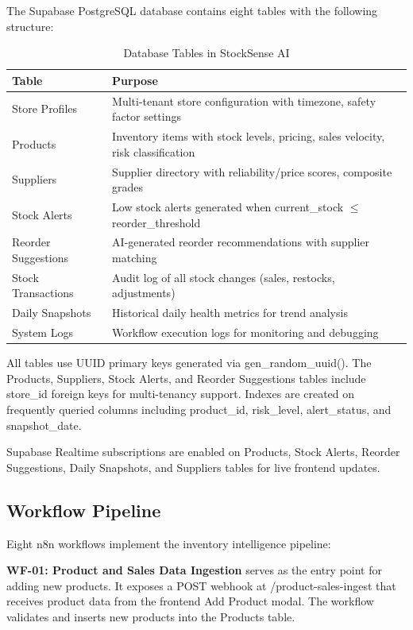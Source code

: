 \documentclass[journal]{IEEEtran}
\begin{document}
The Supabase PostgreSQL database contains eight tables with the following structure:

\begin{table}[htbp]
\centering
\caption{Database Tables in StockSense AI}
\begin{tabular}{p{3cm}p{6cm}}
\toprule
\textbf{Table} & \textbf{Purpose} \\
\midrule
Store Profiles & Multi-tenant store configuration with timezone, safety factor settings \\
Products & Inventory items with stock levels, pricing, sales velocity, risk classification \\
Suppliers & Supplier directory with reliability/price scores, composite grades \\
Stock Alerts & Low stock alerts generated when current\_stock $\leq$ reorder\_threshold \\
Reorder Suggestions & AI-generated reorder recommendations with supplier matching \\
Stock Transactions & Audit log of all stock changes (sales, restocks, adjustments) \\
Daily Snapshots & Historical daily health metrics for trend analysis \\
System Logs & Workflow execution logs for monitoring and debugging \\
\bottomrule
\end{tabular}
\end{table}

All tables use UUID primary keys generated via gen\_random\_uuid(). The Products, Suppliers, Stock Alerts, and Reorder Suggestions tables include store\_id foreign keys for multi-tenancy support. Indexes are created on frequently queried columns including product\_id, risk\_level, alert\_status, and snapshot\_date.

Supabase Realtime subscriptions are enabled on Products, Stock Alerts, Reorder Suggestions, Daily Snapshots, and Suppliers tables for live frontend updates.

\subsection{Workflow Pipeline}

Eight n8n workflows implement the inventory intelligence pipeline:

\textbf{WF-01: Product and Sales Data Ingestion} serves as the entry point for adding new products. It exposes a POST webhook at /product-sales-ingest that receives product data from the frontend Add Product modal. The workflow validates and inserts new products into the Products table.
\end{document}

